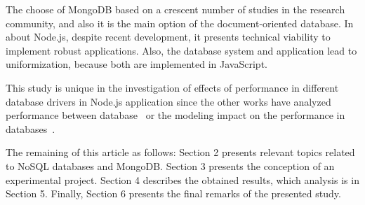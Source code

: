\documentclass{svproc}
\begin{document}

The choose of MongoDB based on a crescent number of studies in the research community, and also it is the main option of the document-oriented database.
In about Node.js, despite recent development, it presents technical viability to implement robust applications.
Also, the database system and application lead to uniformization, because both are implemented in JavaScript.

This study is unique in the investigation of effects of performance in different database drivers in Node.js application since the other works have analyzed performance between database~\cite{jung:2015,patil:2017,ongo:2018} or the modeling impact on the performance in databases~\cite{kanade2014study}.

The remaining of this article as follows: Section 2 presents relevant topics related to NoSQL databases and MongoDB. Section 3 presents the conception of an experimental project. Section 4 describes the obtained results, which analysis is in Section 5. Finally, Section 6 presents the final remarks of the presented study.
\end{document}
